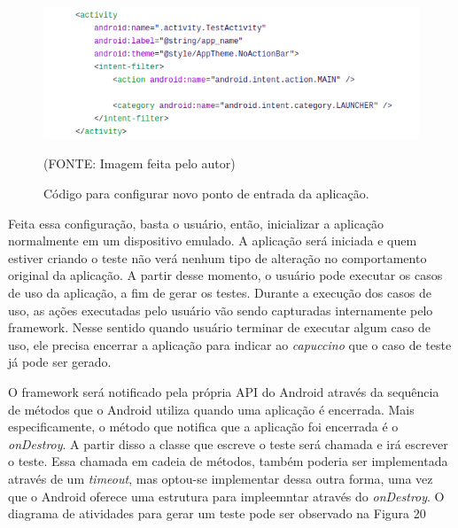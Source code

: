 \documentclass[
    12pt,       %
    openright,      %
    twoside,      %
    a4paper,      %
    english,      %
    french,       %
    spanish,      %
    brazil,       %
    ]{abntex2}
\begin{document}
        \begin{figure}[htbp]
          \begin{center}
            \includegraphics[width=1.0\textwidth]{img/androidManifest.png}
              \end{center}
            \caption{\label{fig:passaro} Código para configurar novo ponto de entrada da aplicação.}
          \begin{center}(FONTE: Imagem feita pelo autor)\end{center}
        \end{figure}

        Feita essa configuração, basta o usuário, então, inicializar a aplicação normalmente em um dispositivo
        emulado. A aplicação será iniciada e quem estiver criando o teste não verá nenhum tipo de alteração
        no comportamento original da aplicação. A partir desse momento, o usuário pode executar os casos de
        uso da aplicação, a fim de gerar os testes. Durante a execução dos casos de uso, as ações executadas
        pelo usuário vão sendo capturadas internamente pelo framework. Nesse sentido quando usuário terminar
        de executar algum caso de uso, ele precisa encerrar a aplicação para indicar ao \textit{capuccino}
        que o caso de teste já pode ser gerado.

        O framework será notificado pela própria API do Android através da sequência de métodos que o Android
        utiliza quando uma aplicação é encerrada. Mais especificamente, o método que notifica que a aplicação
        foi encerrada é o \textit{onDestroy}. A partir disso a classe que escreve o teste será chamada e
        irá escrever o teste. Essa chamada em cadeia de métodos, também poderia ser implementada através de um
        \textit{timeout}, mas optou-se implementar dessa outra forma, uma vez que o Android oferece uma estrutura
        para impleemntar através do \textit{onDestroy}. O diagrama de atividades para gerar um teste pode ser
        observado na Figura 20
\end{document}
